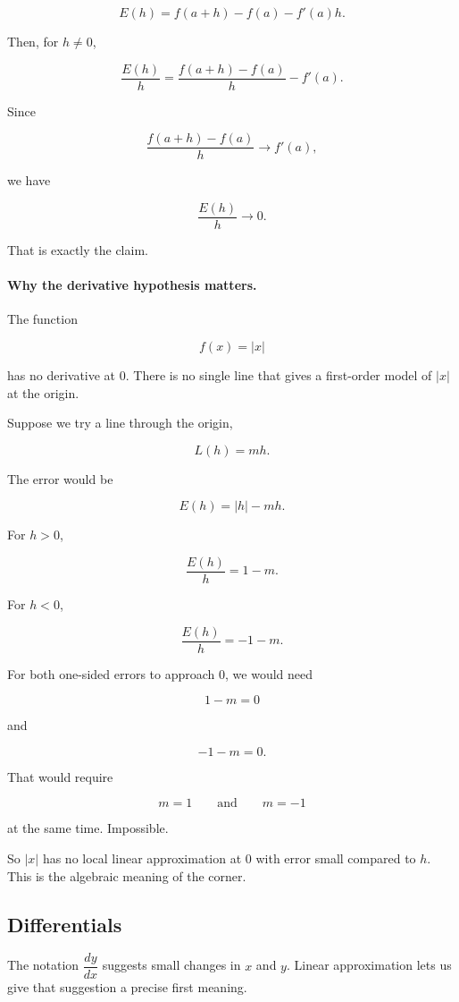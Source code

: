 \[
E(h)=f(a+h)-f(a)-f'(a)h.
\]

Then, for \(h\neq0\),

\[
\frac{E(h)}{h}
=
\frac{f(a+h)-f(a)}{h}-f'(a).
\]

Since

\[
\frac{f(a+h)-f(a)}{h}\to f'(a),
\]

we have

\[
\frac{E(h)}{h}\to0.
\]

That is exactly the claim.

\paragraph{Why the derivative hypothesis matters.}
The function

\[
f(x)=|x|
\]

has no derivative at \(0\).  There is no single line that gives a first-order model of \(|x|\) at the origin.

Suppose we try a line through the origin,

\[
L(h)=mh.
\]

The error would be

\[
E(h)=|h|-mh.
\]

For \(h>0\),

\[
\frac{E(h)}{h}=1-m.
\]

For \(h<0\),

\[
\frac{E(h)}{h}=-1-m.
\]

For both one-sided errors to approach \(0\), we would need

\[
1-m=0
\]

and

\[
-1-m=0.
\]

That would require

\[
m=1
\qquad\text{and}\qquad
m=-1
\]

at the same time.  Impossible.

So \(|x|\) has no local linear approximation at \(0\) with error small compared to \(h\).  This is the algebraic meaning of the corner.

\subsection{Differentials}
\label{subsec:differentials}

The notation \(\dfrac{dy}{dx}\) suggests small changes in \(x\) and \(y\).  Linear approximation lets us give that suggestion a precise first meaning.

